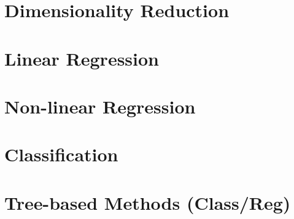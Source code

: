 \section{Dimensionality Reduction}



\newpage

\section{Linear Regression}






\newpage

\section{Non-linear Regression}








\newpage

\section{Classification}







\newpage

\section{Tree-based Methods (Class/Reg)}





